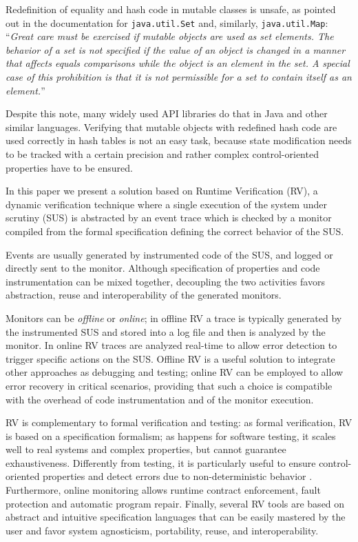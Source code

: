 Redefinition of equality and hash code in mutable classes is unsafe, as pointed out in
the documentation for \lstinline{java.util.Set} \cite{NelsonEtAl2010} and, similarly, \lstinline{java.util.Map}: 
``\emph{Great care must be exercised if mutable objects are used as set elements. The behavior of a set is not specified if the value of an object is changed in a manner that affects equals comparisons while the object is an element in the set. A special case of this prohibition is that it is not permissible for a set to contain itself as an element.}''

Despite this note, many widely used API libraries do that in Java and other similar languages. 
Verifying that mutable objects with redefined hash code are used correctly in hash tables is not an easy task, because state modification needs to be tracked with a certain precision and rather complex control-oriented properties \cite{AhrendtCPS17,AnconaDF18} have to be ensured.

In this paper we present a solution based on Runtime Verification (RV), a dynamic verification technique where
a single execution of the system under scrutiny (SUS) is abstracted by an event trace
which is checked by a monitor compiled from the formal specification defining the correct behavior
of the SUS.

Events are usually generated by instrumented code of the SUS, and logged or directly sent to the monitor.
Although specification of properties and code instrumentation can be mixed together, decoupling the two activities favors abstraction, reuse and
interoperability of the generated monitors.

Monitors can be \emph{offline} or \emph{online};
in offline RV a trace is typically generated by the instrumented SUS and stored into a log file and then is analyzed by the monitor.
In online RV traces are analyzed real-time to allow error detection to trigger specific actions on the SUS. 
Offline RV \cite{Colombo2022} is a useful solution to integrate other approaches as debugging and testing;  %
online RV can be employed to allow error recovery in critical scenarios, providing that such a choice is compatible with the overhead of code instrumentation and of the monitor execution. 

RV is complementary to formal verification and testing:
as formal verification, RV is based on a specification formalism; as happens for software testing, it
scales well to real systems and complex properties, but cannot guarantee exhaustiveness.
Differently from testing, it is particularly useful to ensure control-oriented properties \cite{AhrendtCPS17,AnconaDF18} 
and detect errors due to non-deterministic behavior \cite{havelund2004,sharma2009}.
Furthermore, online monitoring allows runtime contract enforcement, fault protection and automatic program repair.
Finally, several RV tools are based on abstract and intuitive specification languages that can be easily mastered by the user
and favor system agnosticism, portability, reuse, and interoperability.

